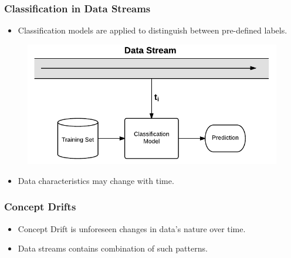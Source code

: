 \documentclass[14pt]{beamer}
\begin{document}
\begin{frame}\frametitle{Classification in Data Streams}

\begin{itemize}
\item Classification models are applied to distinguish between pre-defined labels.
\end{itemize}

\vspace{-0.2in}
\begin{figure}
\centering
\includegraphics[scale=0.6]{Stream1}
\end{figure}
\vspace{-0.2in}
\pause
\begin{itemize}
\item \alert{Data characteristics may change with time}.
\end{itemize}
\end{frame}

\begin{frame}\frametitle{Concept Drifts}
\begin{itemize}
\item Concept Drift is unforeseen changes in data's nature over time.
\end{itemize}

\vspace{-0.5in}

\vspace{-0.5in}
\begin{itemize}
\item Data streams contains combination of such patterns.
\end{itemize}
\end{frame}


\end{document}
